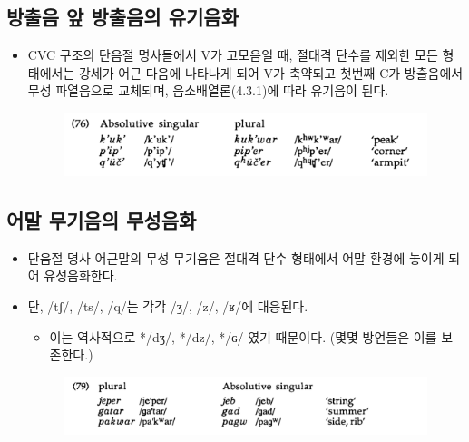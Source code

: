 \subsection{방출음 앞 방출음의 유기음화}
\begin{itemize}
\item CVC 구조의 단음절 명사들에서 V가 고모음일 때, 절대격 단수를 제외한 모든 형태에서는 강세가 어근 다음에 나타나게 되어 V가 축약되고 첫번째 C가 방출음에서 무성 파열음으로 교체되며, 음소배열론(4.3.1)에 따라 유기음이 된다.
\begin{figure}[H]
\centerline{\includegraphics[width=.8\linewidth]{Lezgian/src/ex76.png}}
\end{figure}
\end{itemize}

\subsection{어말 무기음의 무성음화}
\begin{itemize}
\item 단음절 명사 어근말의 무성 무기음은 절대격 단수 형태에서 어말 환경에 놓이게 되어 유성음화한다. 
\item 단, /tʃ/, /ts/, /q/는 각각 /ʒ/, /z/, /ʁ/에 대응된다.
\begin{itemize}
\item 이는 역사적으로 */dʒ/, */dz/, */ɢ/ 였기 때문이다. (몇몇 방언들은 이를 보존한다.)
\end{itemize}
\begin{figure}[H]
\centerline{\includegraphics[width=.8\linewidth]{Lezgian/src/ex79.png}}
\end{figure}
\end{itemize}

